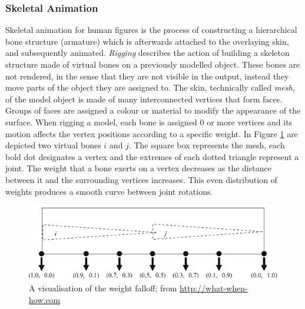 \documentclass[12pt]{ociamthesis}  %
\begin{document}
\subsubsection{Skeletal Animation}
Skeletal animation for human figures is the process of constructing a hierarchical bone structure (armature) which is afterwards attached to the overlaying skin, and subsequently animated. \textit{Rigging} describes the action of building a skeleton structure made of virtual bones on a previously modelled object. These bones are not rendered, in the sense that they are not visible in the output, instead they move parts of the object they are assigned to. The skin, technically called \textit{mesh}, of the model object is made of many interconnected vertices that form faces. Groups of faces are assigned a colour or material to modify the appearance of the surface. When rigging a model, each bone is assigned 0 or more vertices and its motion affects the vertex positions according to a specific weight. In Figure \ref{fig:weights} are depicted two virtual bones $i$ and $j$. The square box represents the mesh, each bold dot designates a vertex and the extremes of each dotted triangle represent a joint. The weight that a bone exerts on a vertex decreases as the distance between it and the surrounding vertices increases. This even distribution of weights produces a smooth curve between joint rotations.

\begin{figure}[H]
	\centering
    \includegraphics[scale=0.5]{chapter4/weights}
    \caption[A visualisation of the weight falloff]{A visualisation of the weight falloff; from \url{http://what-when-how.com}}
    \label{fig:weights}
\end{figure}	
\end{document}
